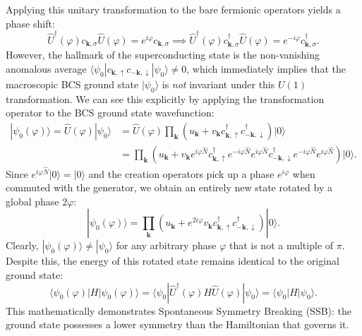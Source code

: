 Applying this unitary transformation to the bare fermionic operators yields a phase shift:
\[
    \hat{U}^\dagger(\varphi) c_{\mathbf{k},\sigma} \hat{U}(\varphi) = e^{i\varphi} c_{\mathbf{k},\sigma} \implies \hat{U}^\dagger(\varphi) c_{\mathbf{k},\sigma}^\dagger \hat{U}(\varphi) = e^{-i\varphi} c_{\mathbf{k},\sigma}^\dagger.
\]
However, the hallmark of the superconducting state is the non-vanishing anomalous average \( \langle \psi_0 | c_{\mathbf{k},\uparrow} c_{-\mathbf{k},\downarrow} | \psi_0 \rangle \neq 0 \), which immediately implies that the macroscopic BCS ground state \( |\psi_0\rangle \) is \emph{not} invariant under this \( U(1) \) transformation. We can see this explicitly by applying the transformation operator to the BCS ground state wavefunction:
\[
    \begin{aligned}
        |\psi_0(\varphi)\rangle = \hat{U}(\varphi) |\psi_0\rangle & = \hat{U}(\varphi) \prod_{\mathbf{k}} \left( u_{\mathbf{k}} + v_{\mathbf{k}} c_{\mathbf{k},\uparrow}^\dagger c_{-\mathbf{k},\downarrow}^\dagger \right) |0\rangle                                                                                            \\
                                                                  & = \prod_{\mathbf{k}} \left( u_{\mathbf{k}} + v_{\mathbf{k}} e^{i\varphi \hat{N}} c_{\mathbf{k},\uparrow}^\dagger e^{-i\varphi \hat{N}} e^{i\varphi \hat{N}} c_{-\mathbf{k},\downarrow}^\dagger e^{-i\varphi \hat{N}} e^{i\varphi \hat{N}} \right) |0\rangle.
    \end{aligned}
\]
Since \( e^{i\varphi \hat{N}} |0\rangle = |0\rangle \) and the creation operators pick up a phase \( e^{i\varphi} \) when commuted with the generator, we obtain an entirely new state rotated by a global phase \( 2\varphi \):
\[
    |\psi_0(\varphi)\rangle = \prod_{\mathbf{k}} \left( u_{\mathbf{k}} + e^{2i\varphi} v_{\mathbf{k}} c_{\mathbf{k},\uparrow}^\dagger c_{-\mathbf{k},\downarrow}^\dagger \right) |0\rangle.
\]
Clearly, \( |\psi_0(\varphi)\rangle \neq |\psi_0\rangle \) for any arbitrary phase \( \varphi \) that is not a multiple of \( \pi \). Despite this, the energy of this rotated state remains identical to the original ground state:
\[
    \langle \psi_0(\varphi) | H | \psi_0(\varphi) \rangle = \langle \psi_0 | \hat{U}^\dagger(\varphi) H \hat{U}(\varphi) | \psi_0 \rangle = \langle \psi_0 | H | \psi_0 \rangle.
\]
This mathematically demonstrates Spontaneous Symmetry Breaking (SSB): the ground state possesses a lower symmetry than the Hamiltonian that governs it.

